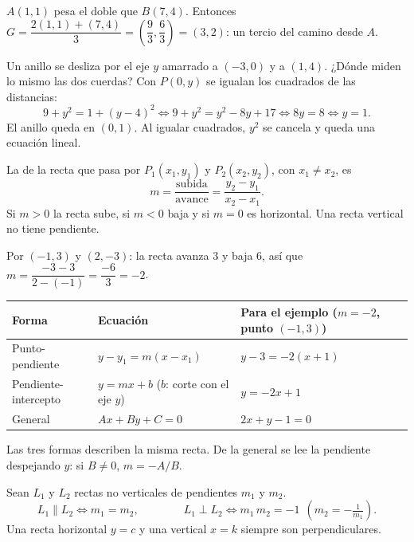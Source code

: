 \documentclass[11pt,a4paper]{article}
\begin{document}
\begin{ejemplo}
$A(1,1)$ pesa el doble que $B(7,4)$. Entonces
$G=\dfrac{2(1,1)+(7,4)}{3}=\left(\dfrac{9}{3},\dfrac{6}{3}\right)=(3,2)$: un tercio del camino desde $A$.
\end{ejemplo}

\begin{ejemplo}
Un anillo se desliza por el eje $y$ amarrado a $(-3,0)$ y a $(1,4)$. ¿Dónde miden lo mismo las dos cuerdas? Con
$P(0,y)$ se igualan los cuadrados de las distancias:
\[ 9+y^2=1+(y-4)^2 \iff 9+y^2=y^2-8y+17 \iff 8y=8 \iff y=1. \]
El anillo queda en $(0,1)$. Al igualar cuadrados, $y^2$ se cancela y queda una ecuación lineal.
\end{ejemplo}

\clearpage
{}

\begin{definicion}[Pendiente]
La  de la recta que pasa por $P_1(x_1,y_1)$ y $P_2(x_2,y_2)$, con $x_1\ne x_2$, es
\[ m=\frac{\text{subida}}{\text{avance}}=\frac{y_2-y_1}{x_2-x_1}. \]
Si $m>0$ la recta sube, si $m<0$ baja y si $m=0$ es horizontal. Una recta vertical no tiene pendiente.
\end{definicion}

\begin{ejemplo}
Por $(-1,3)$ y $(2,-3)$: la recta avanza $3$ y baja $6$, así que $m=\dfrac{-3-3}{2-(-1)}=\dfrac{-6}{3}=-2$.
\end{ejemplo}

\begin{center}
\begin{tabularx}{\linewidth}{@{}l l L@{}}
\toprule
Forma & Ecuación & Para el ejemplo ($m=-2$, punto $(-1,3)$)\\ \midrule
Punto-pendiente & $y-y_1=m(x-x_1)$ & $y-3=-2(x+1)$\\
Pendiente-intercepto & $y=mx+b$ ($b$: corte con el eje $y$) & $y=-2x+1$\\
General & $Ax+By+C=0$ & $2x+y-1=0$\\
\bottomrule
\end{tabularx}
\end{center}
Las tres formas describen la misma recta. De la general se lee la pendiente despejando $y$: si $B\ne0$, $m=-A/B$.

\begin{propiedad}
Sean $L_1$ y $L_2$ rectas no verticales de pendientes $m_1$ y $m_2$.
\[ L_1\parallel L_2 \iff m_1=m_2, \qquad\qquad L_1\perp L_2 \iff m_1\,m_2=-1\ \ \left(m_2=-\tfrac{1}{m_1}\right). \]
Una recta horizontal $y=c$ y una vertical $x=k$ siempre son perpendiculares.
\end{propiedad}
\end{document}
